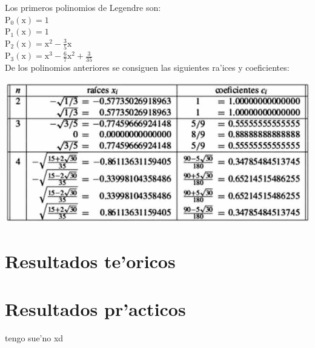 \documentclass{article}
\begin{document}
				Los primeros polinomios de Legendre son:\\
				$\mathrm{P_{0}(x)=1}$\\
				$\mathrm{P_{1}(x)=1}$\\
				$\mathrm{P_{2}(x)=x^{2}-\frac{3}{5}x}$\\
				$\mathrm{P_{3}(x)=x^{3}-\frac{6}{7}x^{2}+\frac{3}{35}}$\\
				De los polinomios anteriores se consiguen las siguientes ra'ices y coeficientes:\\
				
				\begin{center}
					\includegraphics[width=15cm]{roots}
					\par
					\vspace{0.2cm}
				\end{center}
				
	
		\section*{Resultados te'oricos}
		\section*{Resultados pr'acticos}
		
		\begin{thebibliography}{00}
			 tengo sue'no xd
		\end{thebibliography}
	
\end{document}
